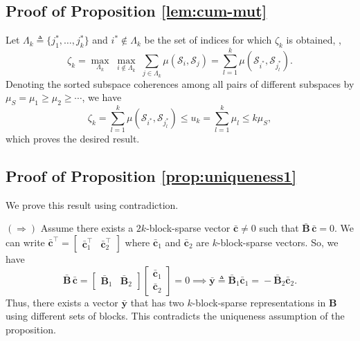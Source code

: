 \documentclass[10pt,twocolumn,twoside] {IEEEtran}
\begin{document}
{\subsection{Proof of Proposition \ref{lem:cum-mut}}
\label{app:lemcummut}
\noindent Let $\Lambda_k \triangleq \{j_1^*, \ldots, j_k^* \}$ and $i^* \notin \Lambda_k$ be the set of indices for which $\zeta_k$ is obtained, {},
\begin{equation}
\zeta_k = \max_{\Lambda_k} \; \max_{i \notin \Lambda_k} \; \sum_{j \in \Lambda_k}{\mu({\mathcal{S}}_i,{\mathcal{S}}_j)} = \sum_{l = 1}^{k}{\mu({\mathcal{S}}_{i^*},{\mathcal{S}}_{j_l^*})}.
\end{equation}
Denoting the sorted subspace coherences among all pairs of different subspaces by $\mu_S = \mu_{1} \geq \mu_{2} \geq \cdots$, 
we have
\begin{equation}
\zeta_k = \sum_{l = 1}^{k}{\mu({\mathcal{S}}_{i^*},{\mathcal{S}}_{j_l^*})} \leq u_k = \sum_{l=1}^{k}{\mu_l} \leq k \mu_S,
\end{equation}
which proves the desired result.

\vspace{-1mm}
\subsection{Proof of Proposition \ref{prop:uniqueness1} }
\label{app:uniquenessprop}
\noindent We prove this result using contradiction. 

\noindent $(\Longrightarrow)$ Assume there exists a $2k$-block-sparse vector $\bar{\boldsymbol{c}} \neq 0$ such that $\bar{\boldsymbol{B}} \, \bar{\boldsymbol{c}} = 0$. We can write $\bar{\boldsymbol{c}}^{\top} = \begin{bmatrix} \bar{\boldsymbol{c}}_1^{\top} & \bar{\boldsymbol{c}}_2^{\top} \end{bmatrix}$ where $\bar{\boldsymbol{c}}_1$ and $\bar{\boldsymbol{c}}_2$ are $k$-block-sparse vectors. So, we have
\begin{equation}
\bar{\boldsymbol{B}} \, \bar{\boldsymbol{c}} =  \begin{bmatrix} \bar{\boldsymbol{B}}_1 & \bar{\boldsymbol{B}}_2 \end{bmatrix} \!\! \begin{bmatrix} \bar{\boldsymbol{c}}_1 \\ \bar{\boldsymbol{c}}_2 \end{bmatrix} = 0 \! \implies \!  \bar{\boldsymbol{y}} \triangleq \bar{\boldsymbol{B}}_1 \bar{\boldsymbol{c}}_1 \!=\! - \bar{\boldsymbol{B}}_2 \bar{\boldsymbol{c}}_2.
\end{equation}
Thus, there exists a vector $\bar{\boldsymbol{y}}$ that has two $k$-block-sparse representations in ${\boldsymbol{B}}$ using different sets of blocks. This contradicts the uniqueness assumption of the proposition.

}
\end{document}
